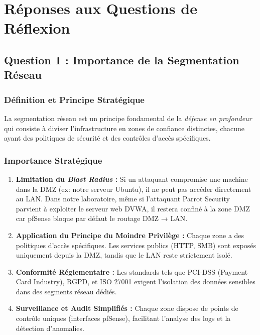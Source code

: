 \documentclass[12pt,a4paper,openany]{report}
\begin{document}
	\chapter{Réponses aux Questions de Réflexion}
	
	\section{Question 1 : Importance de la Segmentation Réseau}
	
	\subsection{Définition et Principe Stratégique}
	La segmentation réseau est un principe fondamental de la \textit{défense en profondeur} qui consiste à diviser l'infrastructure en zones de confiance distinctes, chacune ayant des politiques de sécurité et des contrôles d'accès spécifiques.
	
	\subsection{Importance Stratégique}
	\begin{enumerate}
		\item \textbf{Limitation du \textit{Blast Radius} :} 
		Si un attaquant compromise une machine dans la DMZ (ex: notre serveur Ubuntu), il ne peut pas accéder directement au LAN. Dans notre laboratoire, même si l'attaquant Parrot Security parvient à exploiter le serveur web DVWA, il restera confiné à la zone DMZ car pfSense bloque par défaut le routage DMZ → LAN.
		
		\item \textbf{Application du Principe du Moindre Privilège :} 
		Chaque zone a des politiques d'accès spécifiques. Les services publics (HTTP, SMB) sont exposés uniquement depuis la DMZ, tandis que le LAN reste strictement isolé.
		
		\item \textbf{Conformité Réglementaire :} 
		Les standards tels que PCI-DSS (Payment Card Industry), RGPD, et ISO 27001 exigent l'isolation des données sensibles dans des segments réseau dédiés.
		
		\item \textbf{Surveillance et Audit Simplifiés :} 
		Chaque zone dispose de points de contrôle uniques (interfaces pfSense), facilitant l'analyse des logs et la détection d'anomalies.
	\end{enumerate}
	
\end{document}
